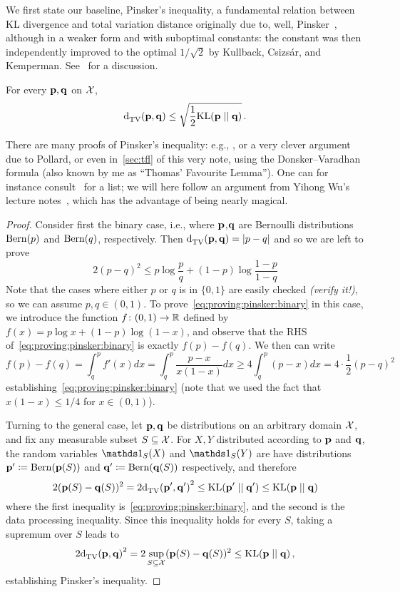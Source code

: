 \documentclass[10pt]{article}
\renewcommand{\eqdef}{\coloneqq}
\begin{document}
  We first state our baseline, Pinsker's inequality, a fundamental relation between KL divergence and total variation distance originally due to, well, Pinsker~\cite{Pinsker64}, although in a weaker form and with suboptimal constants: the constant was then independently improved to the optimal $1/\sqrt{2}$ by Kullback, Csizs\'ar, and Kemperman. See~\cite[Section~2.8]{Tsybakov09} for a discussion.
\begin{lemma}
  \label{lemma:pinsker}
For every $\mathbf{p},\mathbf{q}$ on $\mathcal{X}$, 
\begin{equation}
  \label{eq:pinsker}
  \totalvardist{\p}{\q} \leq \sqrt{\frac{1}{2}\kldiv{\p}{\q}}\,.
\end{equation}
\end{lemma}
There are many proofs of Pinsker's inequality: e.g., \cite[Lemma~2.5]{Tsybakov09}, or a very clever argument due to Pollard, or even in~\autoref{sec:tfl} of this very note, using the Donsker--Varadhan formula (also known by me as ``Thomas' Favourite Lemma''). One can for instance consult~\cite{IlyaRaz:MO} for a list; we will here follow an argument from Yihong Wu's lecture notes~\cite[Theorem~4.5]{Wu20}, which has the advantage of being nearly magical.
\begin{proof}
Consider first the binary case, i.e., where $\mathbf{p}$,$\mathbf{q}$ are Bernoulli distributions $\operatorname{Bern}( p ) $ and $\operatorname{Bern}( q ) $, respectively. Then 
$
    \totalvardist{\p}{\q} = \abs{p-q}
$
and so we are left to prove
\begin{equation}
  \label{eq:proving:pinsker:binary}
    2(p-q)^2 \leq p\log\frac{p}{q} + (1-p)\log\frac{1-p}{1-q}
\end{equation}
Note that the cases where either $p$ or $q$ is in $\{0,1\}$ are easily checked \textit{(verify it!)}, so we can assume $p,q\in(0,1)$. 
To prove~\eqref{eq:proving:pinsker:binary} in this case, we introduce the function $f\colon(0,1)\to\mathbb{R}$ defined by $f(x) = p\log x + (1-p)\log(1-x)$, and observe that the RHS of~\eqref{eq:proving:pinsker:binary} is exactly $f(p)-f(q)$. We then can write
\[
    f(p)-f(q) = \int_{q}^p f'(x)dx = \int_{q}^p \frac{p-x}{x(1-x)}dx \geq 4\int_{q}^p (p-x)dx = 4\cdot \frac{1}{2}(p-q)^2
\]
establishing~\eqref{eq:proving:pinsker:binary} (note that we used the fact that $x(1-x) \leq 1/4$ for $x\in(0,1)$).\smallskip

Turning to the general case, let $\mathbf{p},\mathbf{q}$ be distributions on an arbitrary domain $\mathcal{X}$, and fix any measurable subset $S\subseteq \mathcal{X}$. For $X,Y$ distributed according to $\mathbf{p}$ and $\mathbf{q}$, the random variables $\indicSet{S}(X)$ and $\indicSet{S}(Y)$ are have distributions $\p'\eqdef \bernoulli{\p(S)}$ and $\q' \eqdef \bernoulli{\q(S)}$ respectively, and therefore
\[
    2(\p(S)-\q(S))^2 = 2\totalvardist{\p'}{\q'}^2 \leq \kldiv{\p'}{\q'} \leq \kldiv{\p}{\q}
\]
where the first inequality is~\eqref{eq:proving:pinsker:binary}, and the second is the data processing inequality. Since this inequality holds for every $S$, taking a supremum over $S$ leads to
\[
    2\totalvardist{\p}{\q}^2 = 2\sup_{S\subseteq\domain}(\p(S)-\q(S))^2 \leq \kldiv{\p}{\q}\,,
\]
establishing Pinsker's inequality.
\end{proof}
\end{document}
